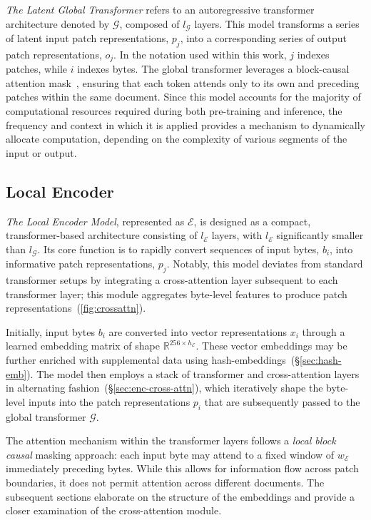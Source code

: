 \textit{The Latent Global Transformer} refers to an autoregressive transformer architecture denoted by $\mathcal{G}$, composed of $l_{\mathcal{G}}$ layers. This model transforms a series of latent input patch representations, $p_j$, into a corresponding series of output patch representations, $o_j$. In the notation used within this work, $j$ indexes patches, while $i$ indexes bytes. The global transformer leverages a block-causal attention mask~\citep{dubey2024llama}, ensuring that each token attends only to its own and preceding patches within the same document. Since this model accounts for the majority of computational resources required during both pre-training and inference, the frequency and context in which it is applied provides a mechanism to dynamically allocate computation, depending on the complexity of various segments of the input or output.

\subsection{Local Encoder}
\label{section:local}

\textit{The Local Encoder Model}, represented as $\mathcal{E}$, is designed as a compact, transformer-based architecture consisting of $l_{\mathcal{E}}$ layers, with $l_{\mathcal{E}}$ significantly smaller than $l_{\mathcal{G}}$. Its core function is to rapidly convert sequences of input bytes, $b_i$, into informative patch representations, $p_j$. Notably, this model deviates from standard transformer setups by integrating a cross-attention layer subsequent to each transformer layer; this module aggregates byte-level features to produce patch representations~(\autoref{fig:crossattn}).

Initially, input bytes $b_i$ are converted into vector representations $x_i$ through a learned embedding matrix of shape $\mathbb{R}^{256 \times h_{\mathcal{E}}}$. These vector embeddings may be further enriched with supplemental data using hash-embeddings~(\S\ref{sec:hash-emb}). The model then employs a stack of transformer and cross-attention layers in alternating fashion~(\S\ref{sec:enc-cross-attn}), which iteratively shape the byte-level inputs into the patch representations $p_i$ that are subsequently passed to the global transformer $\mathcal{G}$.

The attention mechanism within the transformer layers follows a \textit{local block causal} masking approach: each input byte may attend to a fixed window of $w_{\mathcal{E}}$ immediately preceding bytes. While this allows for information flow across patch boundaries, it does not permit attention across different documents. The subsequent sections elaborate on the structure of the embeddings and provide a closer examination of the cross-attention module.

